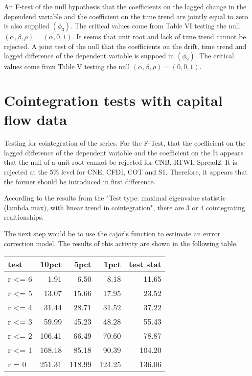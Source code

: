 \documentclass{article}\usepackage{graphicx, color}
\begin{document}
An F-test of the null hypothesis that the coefficients on the lagged change in the dependend variable and the coefficient on the time trend are jointly equal to zero is also supplied $(\phi_3)$.  The critical values come from Table VI \citep{DF1981} testing the null $(\alpha, \beta, \rho) = (\alpha, 0, 1)$.  It seems that unit root and lack of time trend cannot be rejected. A joint test of the null that the coefficients on the drift, time trend and lagged difference of the dependent variable is suppoed in $(\phi_2)$.  The critical values come from Table V \citep{DF1981} testing the null $(\alpha, \beta, \rho) = (0, 0, 1)$.

\section{Cointegration tests with capital flow data}
Testing for cointegration of the series.  For the F-Test, that the coefficient on the lagged difference of the dependent variable and the coefficient on the It appears that the null of a unit root cannot be rejected for CNB, RTWI, Spread2. It is rejected at the 5\% level for CNE, CFDI, COT and S1.  Therefore, it appears that the former should be introduced in first difference. 



According to the results from the "Test type: maximal eigenvalue statistic (lambda max), with linear trend in cointegration", there are 3 or 4 cointegrating realtionships.  


The next step would be to use the cajorls function to estimate an errror correction model. The results of this activity are shown in the following table.

\begin{tabular}{l | r r r r}
test  & 10pct   &   5pct &   1pct & test stat\\
\hline
r <= 6 &   1.91 &  6.50  & 8.18   & 11.65\\
r <= 5 &  13.07 & 15.66  & 17.95  & 23.52\\
r <= 4 &  31.44 & 28.71  & 31.52  & 37.22\\
r <= 3 &  59.99 & 45.23  & 48.28  & 55.43\\
r <= 2 & 106.41 & 66.49  & 70.60  & 78.87\\
r <= 1 & 168.18 & 85.18  & 90.39  & 104.20\\
r = 0  & 251.31 & 118.99 & 124.25 & 136.06\\
\end{tabular}
\end{document}
